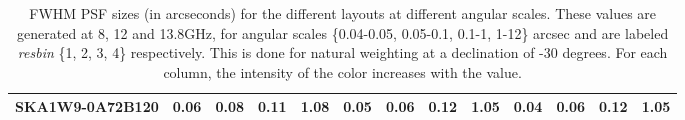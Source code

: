 \begin{table}[!htp]
{{\begin{tabular}{|lcccc||cccc||cccc|}
SKA1W9-0A72B120 & 0.06 \cellcolor{blue!60.00} & 0.08 \cellcolor{red!18.00} & 0.11 \cellcolor{green!21.07} & 1.08 \cellcolor{orange!28.06} & 0.05 \cellcolor{blue!60.00} & 0.06 \cellcolor{red!18.00} & 0.12 \cellcolor{green!39.72} & 1.05 \cellcolor{orange!18.34} & 0.04 \cellcolor{blue!18.00} & 0.06 \cellcolor{red!18.00} & 0.12 \cellcolor{green!57.79} & 1.05 \cellcolor{orange!18.00}\tabularnewline \hline 
\end{tabular}}\hfil 

\caption{FWHM PSF sizes (in arcseconds) for the different layouts at different angular scales. These values are generated at 8, 12 and 13.8GHz, for angular scales \{0.04-0.05, 0.05-0.1, 0.1-1, 1-12\} arcsec and are labeled {\it resbin} \{1, 2, 3, 4\} respectively. This is done for natural weighting at a declination of -30 degrees. For each column, the intensity of the color increases with the value.}\label{tab:psf_mean}}
 \end{table}